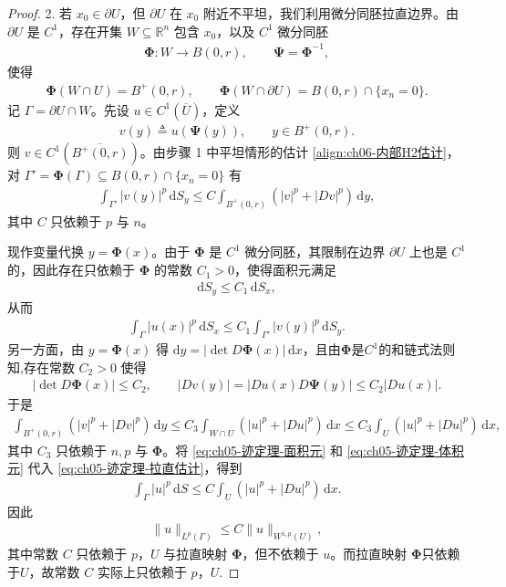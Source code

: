 \documentclass[../../main.tex]{subfiles}%
\begin{document}
\begin{proof}
2. 若 $x_{0}\in\partial U$，但 $\partial U$ 在 $x_{0}$ 附近不平坦，我们利用微分同胚拉直边界。由 $\partial U$ 是 $C^{1}$，存在开集 $W\subseteq\mathbb{R}^{n}$ 包含 $x_{0}$，以及 $C^{1}$ 微分同胚
\begin{align*}
\boldsymbol{\Phi}: W \to B(0,r),\qquad \boldsymbol{\Psi}=\boldsymbol{\Phi}^{-1},
\end{align*}
使得
\begin{align*}
\boldsymbol{\Phi}(W\cap U)=B^{+}(0,r),\qquad
\boldsymbol{\Phi}(W\cap\partial U)=B(0,r)\cap\{x_{n}=0\}.
\end{align*}
记 $\Gamma=\partial U\cap W$。先设 $u\in C^{1}(\overline{U})$，定义
\begin{align*}
v(y)\triangleq u(\boldsymbol{\Psi}(y)),\qquad y\in B^{+}(0,r).
\end{align*}
则 $v\in C^{1}(\overline{B^{+}(0,r)})$。由步骤 1 中平坦情形的估计 \eqref{align:ch06-内部H2估计}，对 $\Gamma'=\boldsymbol{\Phi}(\Gamma)\subseteq B(0,r)\cap\{x_{n}=0\}$ 有
\begin{align}\label{eq:ch05-迹定理-拉直估计}
\int_{\Gamma'}|v(y)|^{p}\,\mathrm{d}S_{y}
\leqslant C\int_{B^{+}(0,r)}(|v|^{p}+|Dv|^{p})\,\mathrm{d}y,
\end{align}
其中 $C$ 只依赖于 $p$ 与 $n$。

现作变量代换 $y=\boldsymbol{\Phi}(x)$。由于 $\boldsymbol{\Phi}$ 是 $C^{1}$ 微分同胚，其限制在边界 $\partial U$ 上也是 $C^{1}$ 的，因此存在只依赖于 $\boldsymbol{\Phi}$ 的常数 $C_{1}>0$，使得面积元满足
\begin{align*}
\mathrm{d}S_{y}\leqslant C_{1}\,\mathrm{d}S_{x},
\end{align*}
从而
\begin{align}\label{eq:ch05-迹定理-面积元}
\int_{\Gamma}|u(x)|^{p}\,\mathrm{d}S_{x}
\leqslant C_{1}\int_{\Gamma'}|v(y)|^{p}\,\mathrm{d}S_{y}.
\end{align}
另一方面，由 $y=\boldsymbol{\Phi}(x)$ 得 $\mathrm{d}y=|\det D\boldsymbol{\Phi}(x)|\,\mathrm{d}x$，且由$\boldsymbol{\Phi}$是$C^1$的和链式法则知,存在常数 $C_{2}>0$ 使得
\begin{align*}
|\det D\boldsymbol{\Phi}(x)|\leqslant C_{2},\qquad
|Dv(y)|=|Du(x)D\boldsymbol{\Psi}(y)|\leqslant C_{2}|Du(x)|.
\end{align*}
于是
\begin{align}\label{eq:ch05-迹定理-体积元}
\int_{B^{+}(0,r)}(|v|^{p}+|Dv|^{p})\,\mathrm{d}y
\leqslant C_{3}\int_{W\cap U}(|u|^{p}+|Du|^{p})\,\mathrm{d}x
\leqslant C_{3}\int_{U}(|u|^{p}+|Du|^{p})\,\mathrm{d}x,
\end{align}
其中 $C_{3}$ 只依赖于 $n,p$ 与 $\boldsymbol{\Phi}$。将 \eqref{eq:ch05-迹定理-面积元} 和 \eqref{eq:ch05-迹定理-体积元} 代入 \eqref{eq:ch05-迹定理-拉直估计}，得到
\begin{align*}
\int_{\Gamma}|u|^{p}\,\mathrm{d}S
\leqslant C\int_{U}(|u|^{p}+|Du|^{p})\,\mathrm{d}x.
\end{align*}
因此
\begin{align*}
\|u\|_{L^{p}(\Gamma)}\leqslant C\|u\|_{W^{1,p}(U)},
\end{align*}
其中常数 $C$ 只依赖于 $p$，$U$ 与拉直映射 $\boldsymbol{\Phi}$，但不依赖于 $u$。而拉直映射 $\boldsymbol{\Phi}$只依赖于$U$，故常数 $C$ 实际上只依赖于 $p$，$U$.


\end{proof}
\end{document}
